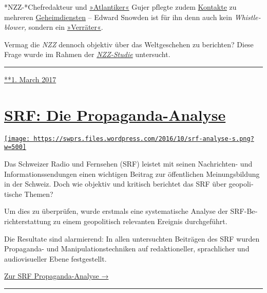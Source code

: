 *NZZ-*Chef­redakteur und
\href{http://bazonline.ch/schweiz/Ein-Atlantiker-an-der-Spitze/story/18216373}{»Atlan­ti­ker«}
Gujer pf‌legte zudem \href{https://www.taz.de/!430263/}{Kon­takte} zu
mehreren
\href{https://web.archive.org/web/20150515195718/http://www.schweizamsonntag.ch/ressort/medien/nzz-chefredaktor_gujer_und_der_geheimdienst/}{Ge­heim­dien­s­ten}
-- Edward Snow­den ist für ihn denn auch kein \emph{Whistle­blower,}
sondern ein
\href{http://www.nzz.ch/schweiz/bern-ist-nicht-bagdad-1.18122326}{»Ver­rä­ter«}.

Vermag die \emph{NZZ} den­noch ob­jek­tiv über das Welt­ge­sche­hen zu
berichten? Diese Frage wur­de im Rah­men der
\emph{\href{https://swprs.org/die-nzz-studie/}{NZZ-Studie}} untersucht.

\begin{center}\rule{0.5\linewidth}{\linethickness}\end{center}

\href{https://swprs.org/2017/03/01/nzz-new-american-century/}{**1. March
2017}

\hypertarget{srf-die-propaganda-analyse}{%
\section{\texorpdfstring{\href{https://swprs.org/2017/03/01/srf-propaganda-analyse/}{SRF:
Die
Propaganda-Analyse}}{SRF: Die Propaganda-Analyse}}\label{srf-die-propaganda-analyse}}

\href{https://swprs.org/2017/03/01/srf-propaganda-analyse/}{\texttt{[image: https://swprs.files.wordpress.com/2016/10/srf-analyse-s.png?w=500]}}

Das Schweizer Radio und Fern­se­hen (SRF) leistet mit seinen
Nach­rich­ten- und In­for­ma­tions­sen­dungen einen wich­tigen Bei­trag
zur öffent­lichen Meinungs­bildung in der Schweiz. Doch wie objektiv und
kritisch be­rich­tet das SRF über geo­po­li­tische The­men?

Um dies zu über­prü­fen, wurde erst­mals eine sys­te­ma­tische Ana­lyse
der SRF-​Be­richt­er­stat­tung zu einem geo­po­li­tisch relevanten
Ereig­nis durch­ge­führt.

Die Resul­tate sind alar­mie­rend: In allen unter­such­ten Bei­trä­gen
des SRF wurden Pro­pa­ganda- und Mani­pu­la­tions­tech­niken auf
re­dak­tio­nel­ler, sprach­licher und audio­vi­su­el­ler Ebene
fest­ge­stellt.

\href{https://swprs.org/srf-propaganda-analyse/}{Zur SRF
Propaganda-Analyse →}

\begin{center}\rule{0.5\linewidth}{\linethickness}\end{center}

